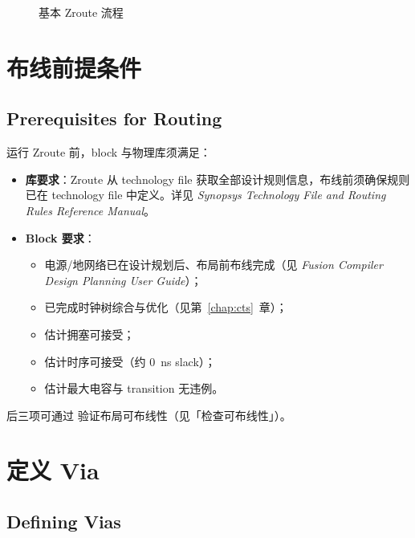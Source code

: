 \begin{figure}[htbp]
\centering
{}
\caption{基本 Zroute 流程}
\label{fig:basic-zroute-flow}
\end{figure}

\section{布线前提条件}
\subsection*{Prerequisites for Routing}

运行 Zroute 前，block 与物理库须满足：
\begin{itemize}
  \item \textbf{库要求}：Zroute 从 technology file 获取全部设计规则信息，布线前须确保规则已在 technology file 中定义。详见 \textit{Synopsys Technology File and Routing Rules Reference Manual}。
  \item \textbf{Block 要求}：
  \begin{itemize}
    \item 电源/地网络已在设计规划后、布局前布线完成（见 \textit{Fusion Compiler Design Planning User Guide}）；
    \item 已完成时钟树综合与优化（见第~\ref{chap:cts}~章）；
    \item 估计拥塞可接受；
    \item 估计时序可接受（约 0~ns slack）；
    \item 估计最大电容与 transition 无违例。
  \end{itemize}
\end{itemize}
后三项可通过  验证布局可布线性（见「检查可布线性」）。

\section{定义 Via}
\subsection*{Defining Vias}

